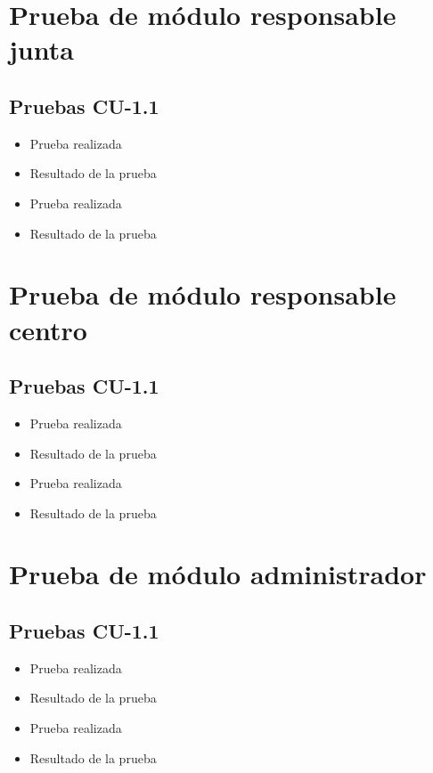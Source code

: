  \section{Prueba de módulo responsable junta}
\subsection{Pruebas CU-1.1}
 \begin{itemize}
    \item Prueba realizada
    \item Resultado de la prueba
    \item Prueba realizada
    \item Resultado de la prueba
 \end{itemize}

  \section{Prueba de módulo responsable centro}
\subsection{Pruebas CU-1.1}
 \begin{itemize}
    \item Prueba realizada
    \item Resultado de la prueba
    \item Prueba realizada
    \item Resultado de la prueba
 \end{itemize}

  \section{Prueba de módulo administrador}
\subsection{Pruebas CU-1.1}
 \begin{itemize}
    \item Prueba realizada
    \item Resultado de la prueba
    \item Prueba realizada
    \item Resultado de la prueba
 \end{itemize}

